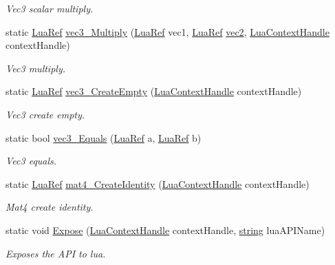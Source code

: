 \begin{DoxyCompactItemize}
\begin{DoxyCompactList}\small\item\em Vec3 scalar multiply. \end{DoxyCompactList}\item 
static \hyperlink{_lua_context_8h_a2220f03700ba40e366f0ee2d684d5c91}{Lua\+Ref} \hyperlink{class_lua_vector_utility_aab330a267a08b73d440b55699fd03474}{vec3\+\_\+\+Multiply} (\hyperlink{_lua_context_8h_a2220f03700ba40e366f0ee2d684d5c91}{Lua\+Ref} vec1, \hyperlink{_lua_context_8h_a2220f03700ba40e366f0ee2d684d5c91}{Lua\+Ref} \hyperlink{_types_8h_a43182e59794291f6ab00e51b160706c2}{vec2}, \hyperlink{_lua_context_8h_a2ffcc2d3ed21165072a1d7b61259bf14}{Lua\+Context\+Handle} context\+Handle)
\begin{DoxyCompactList}\small\item\em Vec3 multiply. \end{DoxyCompactList}\item 
static \hyperlink{_lua_context_8h_a2220f03700ba40e366f0ee2d684d5c91}{Lua\+Ref} \hyperlink{class_lua_vector_utility_a0bddf491591f4be0d0f860362bce33f5}{vec3\+\_\+\+Create\+Empty} (\hyperlink{_lua_context_8h_a2ffcc2d3ed21165072a1d7b61259bf14}{Lua\+Context\+Handle} context\+Handle)
\begin{DoxyCompactList}\small\item\em Vec3 create empty. \end{DoxyCompactList}\item 
static bool \hyperlink{class_lua_vector_utility_a274aa51abd10dadf88643b52e8ffbd93}{vec3\+\_\+\+Equals} (\hyperlink{_lua_context_8h_a2220f03700ba40e366f0ee2d684d5c91}{Lua\+Ref} a, \hyperlink{_lua_context_8h_a2220f03700ba40e366f0ee2d684d5c91}{Lua\+Ref} b)
\begin{DoxyCompactList}\small\item\em Vec3 equals. \end{DoxyCompactList}\item 
static \hyperlink{_lua_context_8h_a2220f03700ba40e366f0ee2d684d5c91}{Lua\+Ref} \hyperlink{class_lua_vector_utility_a58aa97a5050a5d1133f22e3404ba405d}{mat4\+\_\+\+Create\+Identity} (\hyperlink{_lua_context_8h_a2ffcc2d3ed21165072a1d7b61259bf14}{Lua\+Context\+Handle} context\+Handle)
\begin{DoxyCompactList}\small\item\em Mat4 create identity. \end{DoxyCompactList}\item 
static void \hyperlink{class_lua_vector_utility_acbe73ba3691461ae049cd1ff934ff120}{Expose} (\hyperlink{_lua_context_8h_a2ffcc2d3ed21165072a1d7b61259bf14}{Lua\+Context\+Handle} context\+Handle, \hyperlink{_types_8h_ad453f9f71ce1f9153fb748d6bb25e454}{string} lua\+A\+P\+I\+Name)
\begin{DoxyCompactList}\small\item\em Exposes the A\+PI to lua. \end{DoxyCompactList}\end{DoxyCompactItemize}


